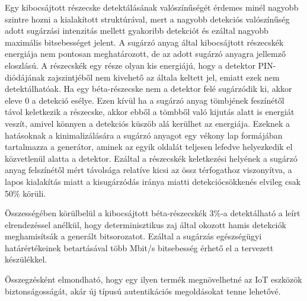 \documentclass[12pt,a4paper,oneside]{article}
\begin{document}
Egy kibocsájtott részecske detektálásának valószínűségét érdemes minél nagyobb szintre hozni a kialakított struktúrával, mert a nagyobb detekciós valószínűség adott sugárzási intenzitás mellett gyakoribb detekciót és ezáltal nagyobb maximális bitsebességet jelent. A sugárzó anyag által kibocsájtott részecskék energiája nem pontosan meghatározott, de az adott sugárzó anyagra jellemző eloszlású. A részecskék egy része olyan kis energiájú, hogy a detektor PIN-diódájának zajszintjéből nem kivehető az általa keltett jel, emiatt ezek nem detektálhatóak. Ha egy béta-részecske nem a detektor felé sugárzódik ki, akkor eleve 0 a detekció esélye. Ezen kívül ha a sugárzó anyag tömbjének feszínétől távol keletkezik a részecske, akkor ebből a tömbből való kijutás alatt is energiát veszít, amivel könnyen a detekciós küszöb alá kerülhet az energiája. Ezeknek a hatásoknak a kinimalizálására a sugárzó anyagot egy vékony lap formájában tartalmazza a generátor, aminek az egyik oldalát teljesen lefedve helyezkedik el közvetlenül alatta a detektor. Ezáltal a részecskék keletkezési helyének a sugárzó anyag felszínétől mért távolsága relatíve kicsi az össz térfogathoz viszonyítva, a lapos kialakítás miatt a kisugárzódás iránya miatti detekciócsökkenés elvileg csak 50\% körüli.
\par
Összességében körülbelül a kibocsájtott béta-részecskék 3\%-a detektálható a leírt elrendezéssel anélkül, hogy determinisztikus zaj által okozott hamis detekciók meghamisítsák a generált bitsorozatot. Ezáltal a sugárzás egészségügyi határértékeinek betartásával több Mbit/s bitsebesség érhető el a tervezett készülékkel.
\par
Összegzésként elmondható, hogy egy ilyen termék megnövelhetné az IoT eszközök biztonságosságát, akár új típusú autentikációs megoldásokat tenne lehetővé.
\end{document}
